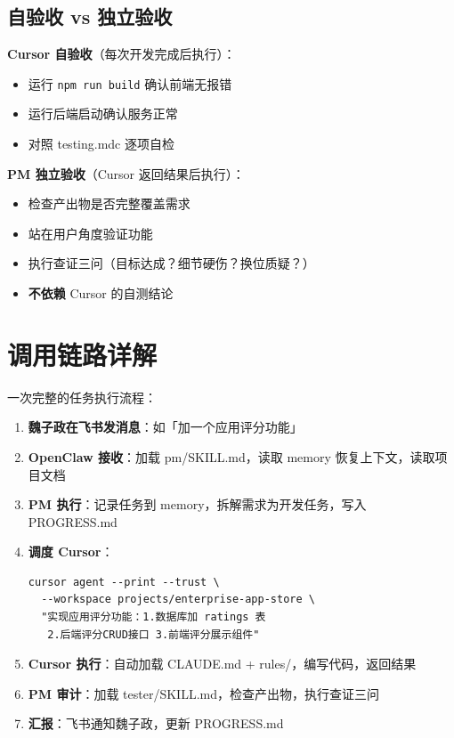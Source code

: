 \documentclass[11pt,a4paper]{article}
\begin{document}
\subsection{自验收 vs 独立验收}

\textbf{Cursor 自验收}（每次开发完成后执行）：
\begin{itemize}[nosep]
  \item 运行 \texttt{npm run build} 确认前端无报错
  \item 运行后端启动确认服务正常
  \item 对照 testing.mdc 逐项自检
\end{itemize}

\textbf{PM 独立验收}（Cursor 返回结果后执行）：
\begin{itemize}[nosep]
  \item 检查产出物是否完整覆盖需求
  \item 站在用户角度验证功能
  \item 执行查证三问（目标达成？细节硬伤？换位质疑？）
  \item \textbf{不依赖} Cursor 的自测结论
\end{itemize}

\section{调用链路详解}

一次完整的任务执行流程：

\begin{enumerate}[nosep]
  \item \textbf{魏子政在飞书发消息}：如「加一个应用评分功能」
  \item \textbf{OpenClaw 接收}：加载 pm/SKILL.md，读取 memory 恢复上下文，读取项目文档
  \item \textbf{PM 执行}：记录任务到 memory，拆解需求为开发任务，写入 PROGRESS.md
  \item \textbf{调度 Cursor}：
\begin{lstlisting}
cursor agent --print --trust \
  --workspace projects/enterprise-app-store \
  "实现应用评分功能：1.数据库加 ratings 表
   2.后端评分CRUD接口 3.前端评分展示组件"
\end{lstlisting}
  \item \textbf{Cursor 执行}：自动加载 CLAUDE.md + rules/，编写代码，返回结果
  \item \textbf{PM 审计}：加载 tester/SKILL.md，检查产出物，执行查证三问
  \item \textbf{汇报}：飞书通知魏子政，更新 PROGRESS.md
\end{enumerate}
\end{document}
